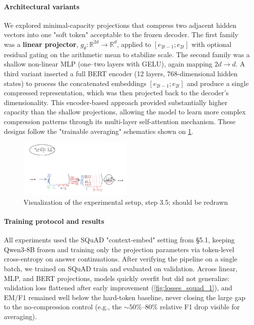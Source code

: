 \paragraph{Architectural variants}
We explored minimal-capacity projections that compress two adjacent hidden vectors into one "soft token" acceptable to the frozen decoder.
The first family was a \textbf{linear projector}, $g_\theta:\mathbb{R}^{2d}\to\mathbb{R}^{d}$, applied to $[e_{2t-1};e_{2t}]$ with optional residual gating on the arithmetic mean to stabilize scale.
The second family was a shallow non-linear MLP (one--two layers with GELU), again mapping $2d\to d$.
A third variant inserted a full BERT encoder \cite{devlin2018bert} (12 layers, 768-dimensional hidden states) to process the concatenated embeddings $[e_{2t-1};e_{2t}]$ and produce a single compressed representation, which was then projected back to the decoder's dimensionality.
This encoder-based approach provided substantially higher capacity than the shallow projections, allowing the model to learn more complex compression patterns through its multi-layer self-attention mechanism.
These designs follow the "trainable averaging" schematics shown on \ref{fig:step35}.

\begin{figure}[hbt]
  \centering
  \includegraphics[width=0.5\textwidth]{graphs/step3.5.jpg}
  \caption{Visualization of the experimental setup, step 3.5; should be redrawn}
  \label{fig:step35}
\end{figure}  

\paragraph{Training protocol and results}
All experiments used the SQuAD \cite{squad} "context-embed" setting from \S5.1, keeping Qwen3-8B frozen and training only the projection parameters via token-level cross-entropy on answer continuations.
After verifying the pipeline on a single batch, we trained on SQuAD train and evaluated on validation.
Across linear, MLP, and BERT projections, models quickly overfit but did not generalize: validation loss flattened after early improvement (\ref{fig:losses_squad_1}), and EM/F1 remained well below the hard-token baseline, never closing the large gap to the no-compression control (e.g., the $\sim 50\%$--$80\%$ relative F1 drop visible for averaging).

